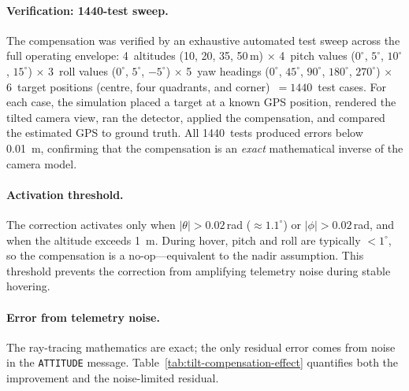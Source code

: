 \paragraph{Verification: 1440-test sweep.}
The compensation was verified by an exhaustive automated test sweep across the full operating envelope: 4~altitudes (10, 20, 35, 50\,m) $\times$ 4~pitch values ($0^{\circ}$, $5^{\circ}$, $10^{\circ}$, $15^{\circ}$) $\times$ 3~roll values ($0^{\circ}$, $5^{\circ}$, $-5^{\circ}$) $\times$ 5~yaw headings ($0^{\circ}$, $45^{\circ}$, $90^{\circ}$, $180^{\circ}$, $270^{\circ}$) $\times$ 6~target positions (centre, four quadrants, and corner)~$= 1440$~test cases.  For each case, the simulation placed a target at a known GPS position, rendered the tilted camera view, ran the detector, applied the compensation, and compared the estimated GPS to ground truth.  All 1440~tests produced errors below \SI{0.01}{\metre}, confirming that the compensation is an \emph{exact} mathematical inverse of the camera model.

\paragraph{Activation threshold.}
The correction activates only when $|\theta| > 0.02$\,rad ($\approx 1.1^{\circ}$) or $|\phi| > 0.02$\,rad, and when the altitude exceeds \SI{1}{\metre}.  During hover, pitch and roll are typically $< 1^{\circ}$, so the compensation is a no-op---equivalent to the nadir assumption.  This threshold prevents the correction from amplifying telemetry noise during stable hovering.

\paragraph{Error from telemetry noise.}
The ray-tracing mathematics are exact; the only residual error comes from noise in the \texttt{ATTITUDE} message.  Table~\ref{tab:tilt-compensation-effect} quantifies both the improvement and the noise-limited residual.

